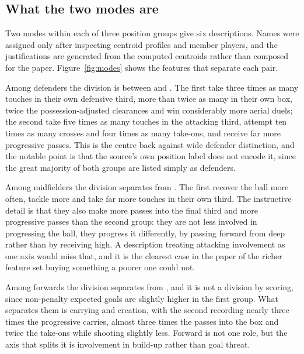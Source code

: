 \subsection{What the two modes are}
\label{sec:results:archetypes}

Two modes within each of three position groups give six descriptions. Names were assigned only
after inspecting centroid profiles and member players, and the justifications are generated from
the computed centroids rather than composed for the paper. Figure~\ref{fig:modes} shows the
features that separate each pair.

Among defenders the division is between \ArcNDFZero{} \ArcNameDFZero{} and \ArcNDFOne{}
\ArcNameDFOne{}. The first take three times as many touches in their own defensive third, more
than twice as many in their own box, twice the possession-adjusted clearances and win
considerably more aerial duels; the second take five times as many touches in the attacking
third, attempt ten times as many crosses and four times as many take-ons, and receive far more
progressive passes. This is the centre back against wide defender distinction, and the notable
point is that the source's own position label does not encode it, since the great majority of both
groups are listed simply as defenders.

Among midfielders the division separates \ArcNMFZero{} \ArcNameMFZero{} from \ArcNMFOne{}
\ArcNameMFOne{}. The first recover the ball more often, tackle more and take far more touches in
their own third. The instructive detail is that they also make more passes into the final third
and more progressive passes than the second group: they are not less involved in progressing the
ball, they progress it differently, by passing forward from deep rather than by receiving high. A
description treating attacking involvement as one axis would miss that, and it is the clearest
case in the paper of the richer feature set buying something a poorer one could not.

Among forwards the division separates \ArcNFWZero{} \ArcNameFWZero{} from \ArcNFWOne{}
\ArcNameFWOne{}, and it is not a division by scoring, since non-penalty expected goals are
slightly higher in the first group. What separates them is carrying and creation, with the second
recording nearly three times the progressive carries, almost three times the passes into the box
and twice the take-ons while shooting slightly less. Forward is not one role, but the axis that
splits it is involvement in build-up rather than goal threat.

